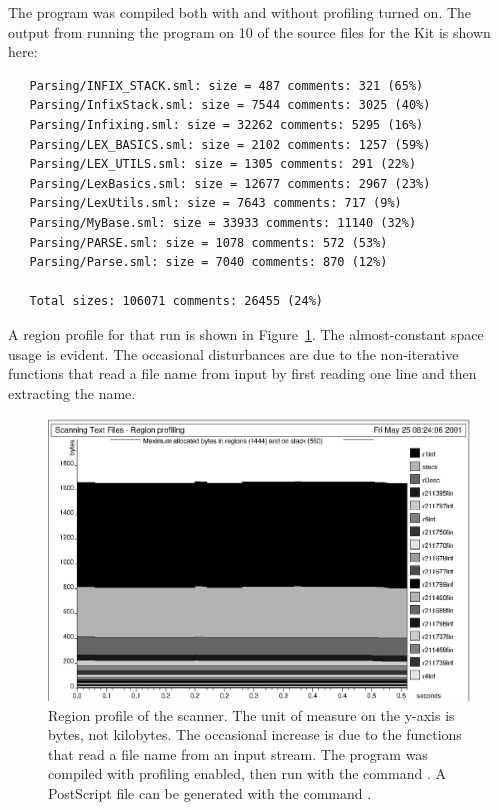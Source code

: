 \documentclass[12pt]{book}
\begin{document}
The program was compiled both with and without profiling turned on.
The output from running the program on 10 of the source files for the
Kit is shown here:
\begin{verbatim}
   Parsing/INFIX_STACK.sml: size = 487 comments: 321 (65%)
   Parsing/InfixStack.sml: size = 7544 comments: 3025 (40%)
   Parsing/Infixing.sml: size = 32262 comments: 5295 (16%)
   Parsing/LEX_BASICS.sml: size = 2102 comments: 1257 (59%)
   Parsing/LEX_UTILS.sml: size = 1305 comments: 291 (22%)
   Parsing/LexBasics.sml: size = 12677 comments: 2967 (23%)
   Parsing/LexUtils.sml: size = 7643 comments: 717 (9%)
   Parsing/MyBase.sml: size = 33933 comments: 11140 (32%)
   Parsing/PARSE.sml: size = 1078 comments: 572 (53%)
   Parsing/Parse.sml: size = 7040 comments: 870 (12%)

   Total sizes: 106071 comments: 26455 (24%)
\end{verbatim}
A region profile for that run is shown in Figure~\ref{scan.fig}.  The
almost-constant space usage is evident. The occasional disturbances
are due to the non-iterative functions that read a file name from
input by first reading one line and then extracting the name.
\begin{figure}
\begin{center}
\includegraphics{scan.ps}
\end{center}
\caption{Region profile of the scanner. The unit of measure on 
  the y-axis is bytes, not kilobytes. The occasional increase is due
  to the functions that read a file name from an input stream.  The
  program was compiled with profiling enabled, then run with the
  command . A
  PostScript file  can be generated with the command
  .  }
\label{scan.fig}
\end{figure}
\end{document}
